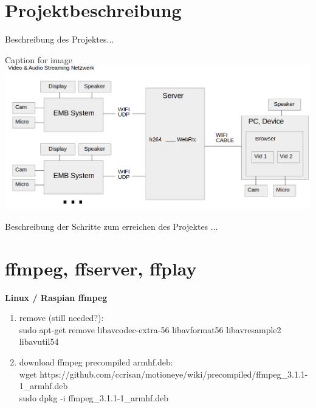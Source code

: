 \section{Projektbeschreibung}

Beschreibung des Projektes...


\begin{minipage}{\textwidth}
    \begin{center}
        Caption for image
        \includegraphics[scale=0.4]{img/schemaproj.png} 
    \end{center}
\end{minipage}


Beschreibung der Schritte zum erreichen des Projektes
...

\section{ffmpeg, ffserver, ffplay}

\textbf{Linux / Raspian ffmpeg} %

\begin{enumerate}
	\item remove (still needed?):\\
	sudo apt-get remove libavcodec-extra-56 libavformat56 libavresample2 libavutil54
	\item download ffmpeg precompiled armhf.deb:\\
	wget https://github.com/ccrisan/motioneye/wiki/precompiled/ffmpeg\_3.1.1-1\_armhf.deb\\
	sudo dpkg -i ffmpeg\_3.1.1-1\_armhf.deb
\end{enumerate}


